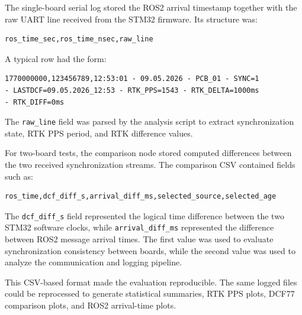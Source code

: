 The single-board serial log stored the ROS2 arrival timestamp together with the raw UART line received from the STM32 firmware. Its structure was:

\begin{verbatim}
ros_time_sec,ros_time_nsec,raw_line
\end{verbatim}

A typical row had the form:

\begin{verbatim}
1770000000,123456789,12:53:01 - 09.05.2026 - PCB_01 - SYNC=1
- LASTDCF=09.05.2026_12:53 - RTK_PPS=1543 - RTK_DELTA=1000ms
- RTK_DIFF=0ms
\end{verbatim}

The \texttt{raw\_line} field was parsed by the analysis script to extract synchronization state, RTK PPS period, and RTK difference values.

For two-board tests, the comparison node stored computed differences between the two received synchronization streams. The comparison CSV contained fields such as:

\begin{verbatim}
ros_time,dcf_diff_s,arrival_diff_ms,selected_source,selected_age
\end{verbatim}

The \texttt{dcf\_diff\_s} field represented the logical time difference between the two STM32 software clocks, while \texttt{arrival\_diff\_ms} represented the difference between ROS2 message arrival times. The first value was used to evaluate synchronization consistency between boards, while the second value was used to analyze the communication and logging pipeline.

This CSV-based format made the evaluation reproducible. The same logged files could be reprocessed to generate statistical summaries, RTK PPS plots, DCF77 comparison plots, and ROS2 arrival-time plots.


